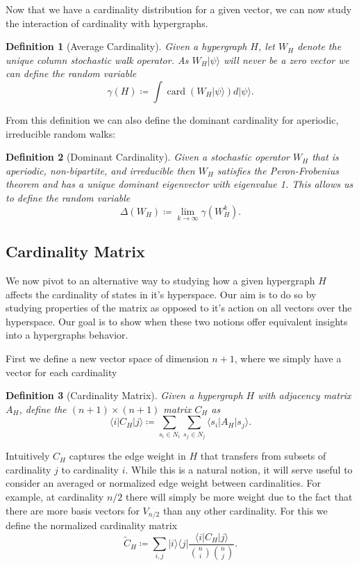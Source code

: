 \documentclass{article}
\newcommand{\ket}[1]{|#1\rangle}
\newcommand{\bra}[1]{\langle #1|}
\newcommand{\ketbra}[2]{| #1\rangle\! \langle #2|}
\newcommand{\parens}[1]{\left( #1 \right)}
\DeclareMathOperator{\card}{card}
\newcommand{\cardi}[1]{\card \parens{ #1 }}
\newcommand{\base}[1]{\ket{s_{#1}}}
\newcommand{\dual}[1]{\bra{s_{#1}}}
\newtheorem{defn}{Definition}
\begin{document}
Now that we have a cardinality distribution for a given vector, we can now study the interaction of cardinality with hypergraphs.
\begin{defn}[Average Cardinality]
    Given a hypergraph $H$, let $W_H$ denote the unique column stochastic walk operator. As $W_H \ket{\psi}$ will never be a zero vector we can define the random variable
    \begin{equation}
        \gamma(H) \coloneqq \int \cardi{W_H \ket{\psi}} d\ket{\psi}.
    \end{equation}
\end{defn}
From this definition we can also define the dominant cardinality for aperiodic, irreducible random walks:
\begin{defn}[Dominant Cardinality]
    Given a stochastic operator $W_H$ that is aperiodic, non-bipartite, and irreducible then $W_H$ satisfies the Peron-Frobenius theorem and has a unique dominant eigenvector with eigenvalue 1. This allows us to define the random variable
    \begin{equation}
        \Delta(W_H) \coloneqq \lim_{k \to \infty} \gamma(W_H^k).
    \end{equation}
\end{defn}

\subsection{Cardinality Matrix}
We now pivot to an alternative way to studying how a given hypergraph $H$ affects the cardinality of states in it's hyperspace. Our aim is to do so by studying properties of the matrix as opposed to it's action on all vectors over the hyperspace. Our goal is to show when these two notions offer equivalent insights into a hypergraphs behavior.

First we define a new vector space of dimension $n+1$, where we simply have a vector for each cardinality
\begin{defn}[Cardinality Matrix]
    Given a hypergraph $H$ with adjacency matrix $A_H$, define the $(n+1) \times (n+1)$ matrix $C_H$ as
    \begin{equation}
        \bra{i} C_H \ket{j} \coloneqq \sum_{s_i \in N_i} \sum_{s_j \in N_j} \dual{i} A_H \base{j}.
    \end{equation}
\end{defn}
Intuitively $C_H$ captures the edge weight in $H$ that transfers from subsets of cardinality $j$ to cardinality $i$. While this is a natural notion, it will serve useful to consider an averaged or normalized edge weight between cardinalities. For example, at cardinality $n/2$ there will simply be more weight due to the fact that there are more basis vectors for $V_{n/2}$ than any other cardinality. For this we define the normalized cardinality matrix
\begin{equation}
    \widetilde{C}_H \coloneqq \sum_{i,j} \ketbra{i}{j} \frac{\bra{i} C_H \ket{j}}{\binom{n}{i} \binom{n}{j}}.
\end{equation}
\end{document}
